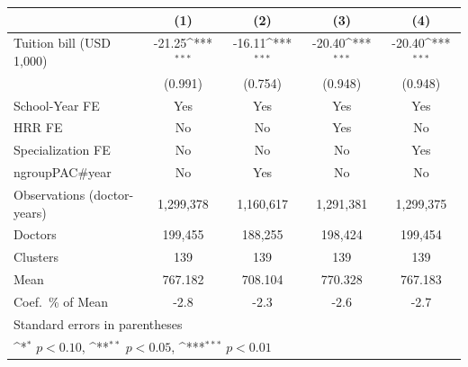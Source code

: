 {
\def\sym#1{\ifmmode^{#1}\else\(^{#1}\)\fi}
\begin{tabular}{l*{4}{c}}
\hline\hline
                    &\multicolumn{1}{c}{(1)}         &\multicolumn{1}{c}{(2)}         &\multicolumn{1}{c}{(3)}         &\multicolumn{1}{c}{(4)}         \\
\hline
Tuition bill (USD 1,000)&      -21.25\sym{***}&      -16.11\sym{***}&      -20.40\sym{***}&      -20.40\sym{***}\\
                    &     (0.991)         &     (0.754)         &     (0.948)         &     (0.948)         \\
[1em]
School-Year FE      &         Yes         &         Yes         &         Yes         &         Yes         \\
[1em]
HRR FE              &          No         &          No         &         Yes         &          No         \\
[1em]
Specialization FE   &          No         &          No         &          No         &         Yes         \\
[1em]
ngroupPAC#year      &          No         &         Yes         &          No         &          No         \\
\hline
Observations (doctor-years)&   1,299,378         &   1,160,617         &   1,291,381         &   1,299,375         \\
Doctors             &     199,455         &     188,255         &     198,424         &     199,454         \\
Clusters            &         139         &         139         &         139         &         139         \\
Mean                &     767.182         &     708.104         &     770.328         &     767.183         \\
Coef.\ \% of Mean   &        -2.8         &        -2.3         &        -2.6         &        -2.7         \\
\hline\hline
\multicolumn{5}{l}{\footnotesize Standard errors in parentheses}\\
\multicolumn{5}{l}{\footnotesize \sym{*} \(p<0.10\), \sym{**} \(p<0.05\), \sym{***} \(p<0.01\)}\\
\end{tabular}
}
